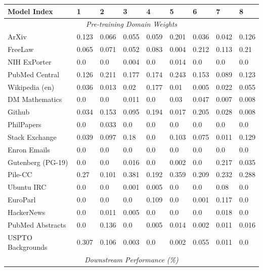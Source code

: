 \documentclass{article}
\theoremstyle{definition}
\theoremstyle{remark}
\begin{document}
\begin{table}[!ht]
    \centering
    \begin{tabular}{lllllllll}
    \toprule
        \textbf{Model Index} & \textbf{1} & \textbf{2} & \textbf{3} & \textbf{4} & \textbf{5} & \textbf{6} & \textbf{7} & \textbf{8} \\ 
        \midrule
        \multicolumn{9}{c}{\textit{Pre-training Domain Weights}} \\
        ArXiv & 0.123 & 0.066 & 0.055 & 0.059 & 0.201 & 0.036 & 0.042 & 0.126 \\ 
        FreeLaw & 0.065 & 0.071 & 0.052 & 0.083 & 0.004 & 0.212 & 0.113 & 0.21 \\ 
        NIH ExPorter & 0.0 & 0.0 & 0.004 & 0.0 & 0.014 & 0.0 & 0.0 & 0.0 \\ 
        PubMed Central & 0.126 & 0.211 & 0.177 & 0.174 & 0.243 & 0.153 & 0.089 & 0.123 \\ 
        Wikipedia (en) & 0.036 & 0.013 & 0.02 & 0.177 & 0.01 & 0.005 & 0.022 & 0.055 \\ 
        DM Mathematics & 0.0 & 0.0 & 0.011 & 0.0 & 0.03 & 0.047 & 0.007 & 0.008 \\ 
        Github & 0.034 & 0.153 & 0.095 & 0.194 & 0.017 & 0.205 & 0.028 & 0.008 \\ 
        PhilPapers & 0.0 & 0.033 & 0.0 & 0.0 & 0.0 & 0.0 & 0.0 & 0.0 \\ 
        Stack Exchange & 0.039 & 0.097 & 0.18 & 0.0 & 0.103 & 0.075 & 0.011 & 0.129 \\ 
        Enron Emails & 0.0 & 0.0 & 0.0 & 0.0 & 0.0 & 0.0 & 0.0 & 0.0 \\ 
        Gutenberg (PG-19) & 0.0 & 0.0 & 0.016 & 0.0 & 0.002 & 0.0 & 0.217 & 0.035 \\ 
        Pile-CC & 0.27 & 0.101 & 0.381 & 0.192 & 0.359 & 0.209 & 0.232 & 0.288 \\ 
        Ubuntu IRC & 0.0 & 0.0 & 0.001 & 0.005 & 0.0 & 0.0 & 0.08 & 0.0 \\ 
        EuroParl & 0.0 & 0.0 & 0.0 & 0.109 & 0.0 & 0.001 & 0.117 & 0.0 \\ 
        HackerNews & 0.0 & 0.011 & 0.005 & 0.0 & 0.0 & 0.0 & 0.018 & 0.0 \\ 
        PubMed Abstracts & 0.0 & 0.136 & 0.0 & 0.005 & 0.014 & 0.002 & 0.011 & 0.016 \\ 
        USPTO Backgrounds & 0.307 & 0.106 & 0.003 & 0.0 & 0.002 & 0.055 & 0.011 & 0.0 \\
        \midrule
        \multicolumn{9}{c}{\textit{Downstream Performance (\%)}} \\

\end{tabular}
\end{table}
\end{document}
